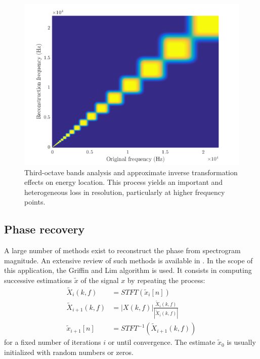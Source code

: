 \documentclass[12pt,times,onecolumn]{article}
\begin{document}
\begin{figure}[htbp]
	\centering
		\includegraphics[width=0.7\columnwidth]{figures/freq.png}
	\caption{Third-octave bands analysis and approximate inverse transformation effects on energy location. This process yields an important and heterogeneous loss in resolution, particularly at higher frequency points.}
	\label{fig:freq}
\end{figure}

\subsection{Phase recovery}
A large number of methods exist to reconstruct the phase from spectrogram magnitude. An extensive review of such methods is available in \cite{sturmel2011}. In the scope of this application, the Griffin and Lim algorithm \cite{griffin1984} is used. It consists in computing successive estimations $\tilde{x}$ of the signal $x$ by repeating the process:
\begin{align}
\tilde{X}_{i}(k, f) &= STFT(\tilde{x}_{i}[n])\\
\tilde{X}_{i+1}(k, f) &= |X(k, f)|\frac{\tilde{X}_{i}(k, f)}{|\tilde{X}_{i}(k, f)|}\\
\tilde{x}_{i+1}[n] &= STFT^{-1}(\tilde{X}_{i+1}(k, f))
\end{align}
for a fixed number of iterations $i$ or until convergence. The estimate $\tilde{x}_0$ is usually initialized with random numbers or zeros.


\clearpage




\end{document}
